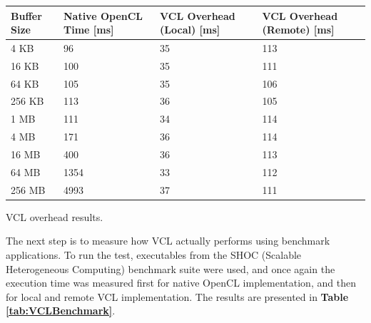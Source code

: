 \begin{tablehere}
{\footnotesize
\begin{tabular}{|p{}|p{}|p{}|p{}|}\hline
\textbf{Buffer Size} & \textbf{Native OpenCL Time} [ms] & \textbf{VCL Overhead (Local)} [ms] & \textbf{VCL Overhead (Remote)} [ms]\\ \hline
4 KB & 96 & 35 & 113 \\ \hline
16 KB & 100 & 35 & 111 \\ \hline
64 KB & 105 & 35 & 106 \\ \hline
256 KB & 113 & 36 & 105 \\ \hline
1 MB & 111 & 34 & 114 \\ \hline
4 MB & 171 & 36 & 114 \\ \hline
16 MB & 400 & 36 & 113 \\ \hline
64 MB & 1354 & 33 & 112 \\ \hline
256 MB & 4993 & 37 & 111 \\ \hline
\end{tabular}}
  \caption{VCL overhead results.\\}
	\label{tab:VCLOverhead}
\end{tablehere}

The next step is to measure how VCL actually performs using benchmark applications. To run the test, executables from the SHOC (Scalable Heterogeneous Computing) benchmark suite were used, and once again the execution time was measured first for native OpenCL implementation, and then for local and remote VCL implementation. The results are presented in \textbf{Table \ref{tab:VCLBenchmark}}.\\

